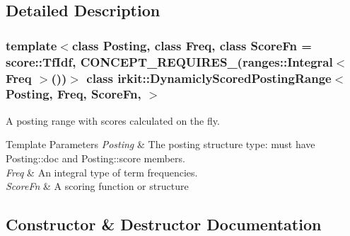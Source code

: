 \subsection{Detailed Description}
\subsubsection*{template$<$class Posting, class Freq, class Score\+Fn = score\+::\+Tf\+Idf, C\+O\+N\+C\+E\+P\+T\+\_\+\+R\+E\+Q\+U\+I\+R\+E\+S\+\_\+(ranges\+::\+Integral$<$ Freq $>$())$>$\newline
class irkit\+::\+Dynamicly\+Scored\+Posting\+Range$<$ Posting, Freq, Score\+Fn, $>$}

A posting range with scores calculated on the fly. 


\begin{DoxyTemplParams}{Template Parameters}
{\em Posting} & The posting structure type\+: must have {\ttfamily Posting\+::doc} and {\ttfamily Posting\+::score} members. \\
\hline
{\em Freq} & An integral type of term frequencies. \\
\hline
{\em Score\+Fn} & A scoring function or structure \\
\hline
\end{DoxyTemplParams}


\subsection{Constructor \& Destructor Documentation}
\mbox{\label{classirkit_1_1DynamiclyScoredPostingRange_a505ae46df58b541505dcc795df5e045d}} 
